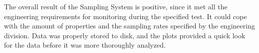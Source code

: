 The overall result of the Sampling System is positive,
since it met all the engineering requirements for
monitoring during the specified test.
It could cope with the amount of properties and the sampling rates
specified by the engineering division.
Data was properly stored to disk, and the plots
provided a quick look for the data before it was
more thoroughly analyzed.











